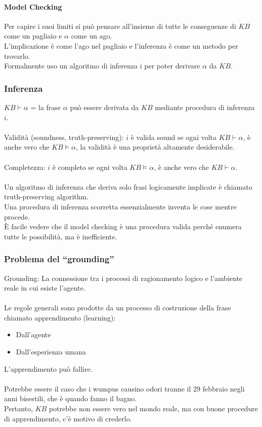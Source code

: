 \documentclass[../main.tex]{subfiles}
\begin{document}
	\paragraph{Model Checking}
	Per capire i suoi limiti si può pensare all'insieme di tutte le conseguenze di $KB$ come un pagliaio e $\alpha$ come un ago.\\
	L'implicazione è come l'ago nel pagliaio e l'inferenza è come un metodo per trovarlo.\\
	Formalmente uso un algoritmo di inferenza i per poter derivare $\alpha$ da $KB$.
	\subsubsection{Inferenza}
	$KB \vdash \alpha$ = la frase $\alpha$ può essere derivata da $KB$ mediante procedura di inferenza $i$.\\\\
	Validità (soundness, truth-preserving): $i$ è valida sound se ogni volta $KB \vdash \alpha$, è anche vero che $KB \vDash \alpha$, la validità è una proprietà altamente desiderabile.\\\\
	Completezza: $i$ è completo se ogni volta $KB \vDash \alpha$, è anche vero che $KB \vdash \alpha$.\\\\
	Un algoritmo di inferenza che deriva solo frasi logicamente implicate è chiamato truth-preserving algorithm.\\
	Una procedura di inferenza scorretta essenzialmente inventa le cose mentre procede.\\
	È facile vedere che il model checking è una procedura valida perché enumera tutte le possibilità, ma è inefficiente.
	\subsubsection{Problema del “grounding”}
	Grounding: La connessione tra i processi di ragionamento logico e l'ambiente reale in cui esiste l'agente.\\\\
	Le regole generali sono prodotte da un processo di costruzione della frase chiamato apprendimento (learning):
	\begin{itemize}
		\item Dall'agente
		\item Dall'esperienza umana
	\end{itemize}
	L'apprendimento può fallire.\\\\
	Potrebbe essere il caso che i wumpus causino odori tranne il 29 febbraio negli anni bisestili, che è quando fanno il bagno.\\
	Pertanto, $KB$ potrebbe non essere vero nel mondo reale, ma con buone procedure di apprendimento, c'è motivo di crederlo.
\end{document}
